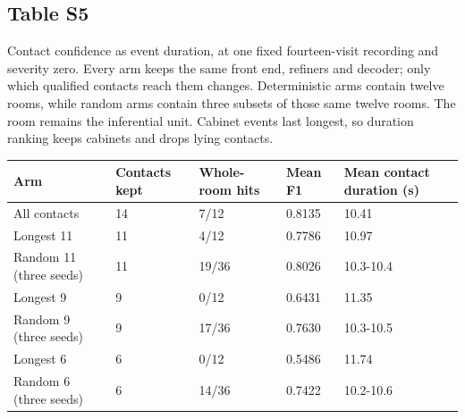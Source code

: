 \documentclass[10pt,letterpaper]{article}
\begin{document}
\begin{minipage}{\linewidth}\subsection*{Table S5}
Contact confidence as event duration, at one fixed fourteen-visit
recording and severity zero. Every arm keeps the same front end,
refiners and decoder; only which qualified contacts reach them changes.
Deterministic arms contain twelve rooms, while random arms contain three
subsets of those same twelve rooms. The room remains the inferential
unit. Cabinet events last longest, so duration ranking keeps cabinets
and drops lying contacts.



\begin{center}\small\begin{tabular}{@{}p{}p{}p{}p{}p{}@{}}\toprule
\textbf{Arm} & \textbf{Contacts kept} & \textbf{Whole-room hits} & \textbf{Mean F1} & \textbf{Mean contact duration (s)} \\ \midrule
All contacts & 14 & 7/12 & 0.8135 & 10.41 \\
Longest 11 & 11 & 4/12 & 0.7786 & 10.97 \\
Random 11 (three seeds) & 11 & 19/36 & 0.8026 & 10.3-10.4 \\
Longest 9 & 9 & 0/12 & 0.6431 & 11.35 \\
Random 9 (three seeds) & 9 & 17/36 & 0.7630 & 10.3-10.5 \\
Longest 6 & 6 & 0/12 & 0.5486 & 11.74 \\
Random 6 (three seeds) & 6 & 14/36 & 0.7422 & 10.2-10.6 \\
\bottomrule\end{tabular}\end{center}
\end{minipage}\par\medskip
\end{document}
